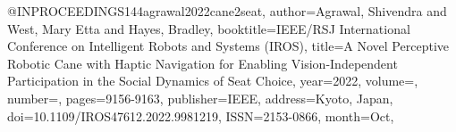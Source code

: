 @INPROCEEDINGS{144agrawal2022cane2seat,
author={Agrawal, Shivendra and West, Mary Etta and Hayes, Bradley},
booktitle={IEEE/RSJ International Conference on Intelligent Robots and Systems (IROS)}, 
title={A Novel Perceptive Robotic Cane with Haptic Navigation for Enabling Vision-Independent Participation in the Social Dynamics of Seat Choice}, 
year={2022},
volume={},
number={},
pages={9156-9163},
publisher={IEEE},
address={Kyoto, Japan},
doi={10.1109/IROS47612.2022.9981219},
ISSN={2153-0866},
month={Oct},}